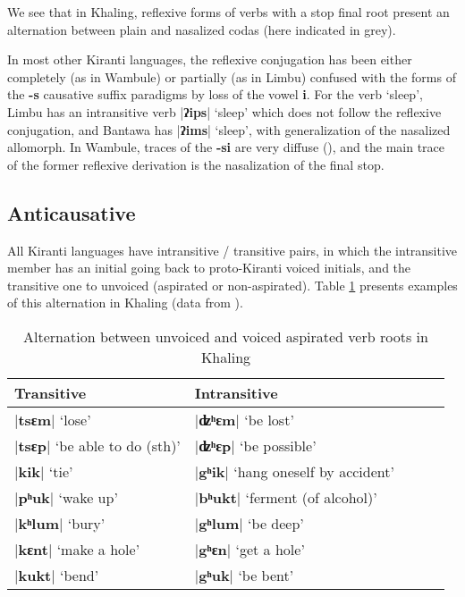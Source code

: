 \documentclass[oneside,a4paper,11pt]{article}
\newcommand{\ipa}[1]{\textbf{{\phon\mbox{#1}}}} %
\newcommand{\dhatu}[2]{|\ipa{#1}| `#2'}
\begin{document}
We see that in Khaling, reflexive forms of verbs with a stop final root present an alternation between plain and nasalized codas (here indicated in grey). 

In most other Kiranti languages, the reflexive conjugation has been either completely (as in Wambule) or partially (as in Limbu) confused with the forms of the \ipa{-s} causative suffix paradigms by loss of the vowel \ipa{i}. For the verb `sleep', Limbu has an intransitive verb \dhatu{ʔips}{sleep} which does not follow the reflexive conjugation, and Bantawa has \dhatu{ʔims}{sleep}, with generalization of the nasalized allomorph. In Wambule, traces of the \ipa{-si} are very diffuse (\citealt[305]{opgenort04wambule}), and the main trace of the former reflexive derivation is the nasalization of the final stop.
 

\subsection{Anticausative} \label{sec:anticaus}
All Kiranti languages have intransitive / transitive pairs, in which the intransitive member has an initial going back to proto-Kiranti voiced initials, and the transitive one to unvoiced (aspirated or non-aspirated). Table \ref{tab:anticaus} presents examples of this alternation in Khaling (data from \citealt{jacques15derivational.khaling}).

\begin{table}[H]
\caption{Alternation between unvoiced and voiced aspirated verb roots in Khaling} \centering \label{tab:anticaus}
\begin{tabular}{lllll}
\toprule
Transitive & Intransitive&  \\
\midrule
\dhatu{tsɛm}{lose} & \dhatu{ʣʰɛm}{be lost} \\
\dhatu{tsɛp}{be able to do (sth)} & \dhatu{ʣʰɛp}{be possible} \\
\dhatu{kik}{tie} & \dhatu{gʰik}{hang oneself by accident} \\
\dhatu{pʰuk}{wake up} & \dhatu{bʰukt}{ferment (of alcohol)} \\
\dhatu{kʰlum}{bury} & \dhatu{gʰlum}{be deep} \\
\midrule
\dhatu{kɛnt}{make a hole} & \dhatu{gʰɛn}{get a hole} \\
\dhatu{kukt}{bend} & \dhatu{gʰuk}{be bent}\\
\bottomrule
\end{tabular}
\end{table}
\end{document}

